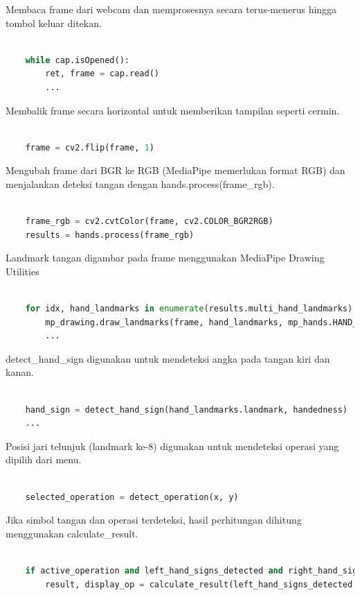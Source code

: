 \documentclass[11pt,a4paper]{article}
\begin{document}
    Membaca frame dari webcam dan memprosesnya secara terus-menerus hingga tombol keluar ditekan.
    \begin{lstlisting}[language=Python, caption=Membaca Frame]
    
    while cap.isOpened():
        ret, frame = cap.read()
        ...
    \end{lstlisting}
    
    Membalik frame secara horizontal untuk memberikan tampilan seperti cermin.
    \begin{lstlisting}[language=Python, caption=Mirror Camera]
    
    frame = cv2.flip(frame, 1)
    \end{lstlisting}

    Mengubah frame dari BGR ke RGB (MediaPipe memerlukan format RGB) dan menjalankan deteksi tangan dengan hands.process(frame\_rgb).
    \begin{lstlisting}[language=Python, caption=Konversi ke RGB]
    
    frame_rgb = cv2.cvtColor(frame, cv2.COLOR_BGR2RGB)
    results = hands.process(frame_rgb)
    \end{lstlisting}

    Landmark tangan digambar pada frame menggunakan MediaPipe Drawing Utilities
    \begin{lstlisting}[language=Python, caption=Menggambar Landmark]
    
    for idx, hand_landmarks in enumerate(results.multi_hand_landmarks):
        mp_drawing.draw_landmarks(frame, hand_landmarks, mp_hands.HAND_CONNECTIONS)
        ...
    \end{lstlisting}

    detect\_hand\_sign digunakan untuk mendeteksi angka pada tangan kiri dan kanan.
    \begin{lstlisting}[language=Python, caption=Proses Deteksi Nilai Tangan]

    hand_sign = detect_hand_sign(hand_landmarks.landmark, handedness)
    ...
    \end{lstlisting}

    Posisi jari telunjuk (landmark ke-8) digunakan untuk mendeteksi operasi yang dipilih dari menu.
    \begin{lstlisting}[language=Python, caption=Pemilihan Operasi]
    
    selected_operation = detect_operation(x, y)
    \end{lstlisting}

    Jika simbol tangan dan operasi terdeteksi, hasil perhitungan dihitung menggunakan calculate\_result.
    \begin{lstlisting}[language=Python, caption=Proses Kalkulasi]
    
    if active_operation and left_hand_signs_detected and right_hand_signs_detected:
        result, display_op = calculate_result(left_hand_signs_detected[0], right_hand_signs_detected[0], active_operation)
    \end{lstlisting}
\end{document}
